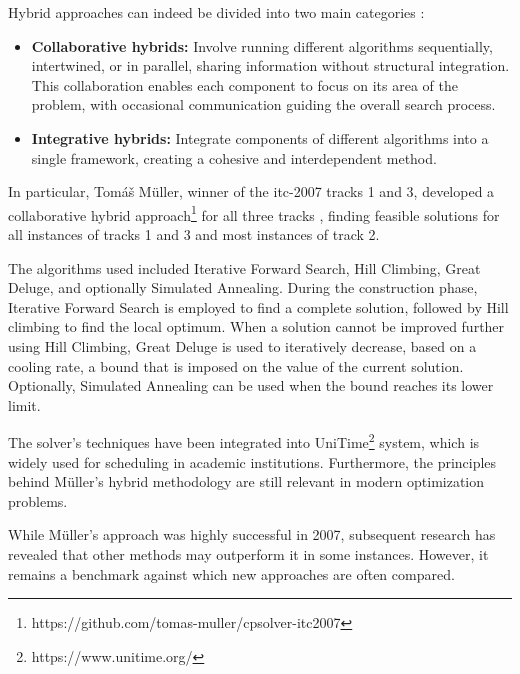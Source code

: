 Hybrid approaches can indeed be divided into two main categories \cite{abdipoor_meta-heuristic_2023}:

\begin{itemize}
\item \textbf{Collaborative hybrids:} Involve running different algorithms sequentially, intertwined, or in parallel, sharing information without structural integration. This collaboration enables each component to focus on its area of the problem, with occasional communication guiding the overall search process.

\item \textbf{Integrative hybrids:} Integrate components of different algorithms into a single framework, creating a cohesive and interdependent method.

\end{itemize}


In particular, Tomáš Müller, winner of the \ac{itc-2007} tracks 1 and 3, developed a collaborative hybrid approach\footnote{https://github.com/tomas-muller/cpsolver-itc2007} for all three tracks \cite{muller_itc2007}, finding feasible solutions for all instances of tracks 1 and 3 and most instances of track 2. 

The algorithms used included Iterative Forward Search, Hill Climbing, Great Deluge, and optionally Simulated Annealing. During the construction phase, Iterative Forward Search is employed to find a complete solution, followed by Hill climbing to find the local optimum. When a solution cannot be improved further using Hill Climbing, Great Deluge is used to iteratively decrease, based on a cooling rate, a bound that is imposed on the value of the current solution. Optionally, Simulated Annealing can be used when the bound reaches its lower limit.

The solver's techniques have been integrated into UniTime\footnote{https://www.unitime.org/} system, which is widely used for scheduling in academic institutions. Furthermore, the principles behind Müller's hybrid methodology are still relevant in modern optimization problems.

While Müller's approach was highly successful in 2007, subsequent research has revealed that other methods may outperform it in some instances. However, it remains a benchmark against which new approaches are often compared.
